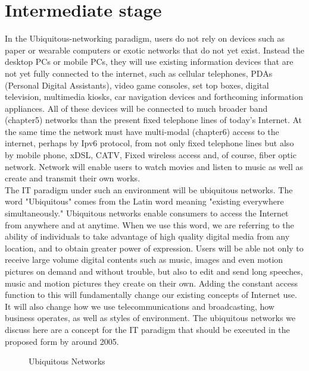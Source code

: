 \documentclass[12pt]{report}
\begin{document}
\section{Intermediate stage}
\hspace*{0.5in}In the Ubiquitous-networking paradigm, users do not rely on devices such as paper or wearable computers or exotic networks that do not yet exist. Instead the desktop PCs or mobile PCs, they will use existing information devices that are not yet fully connected to the internet, such as cellular telephones, PDAs (Personal Digital Assistants), video game consoles, set top boxes, digital television, multimedia kiosks, car navigation devices and forthcoming information appliances. All of these devices will be connected to much broader band (chapter5) networks than the present fixed telephone lines of today's Internet. At the same time the network must have multi-modal (chapter6) access to the internet, perhaps by Ipv6 protocol, from not only fixed telephone lines but also by mobile phone, xDSL, CATV, Fixed wireless access and, of course, fiber optic network. Network will enable users to watch movies and listen to music as well as create and transmit their own works.
\\\hspace*{0.5in}The IT paradigm under such an environment will be ubiquitous networks. The word "Ubiquitous" comes from the Latin word meaning "existing everywhere simultaneously." Ubiquitous networks enable consumers to access the Internet from anywhere and at anytime. When we use this word, we are referring to the ability of individuals to take advantage of high quality digital media from any location, and to obtain greater power of expression. Users will be able not only to receive large volume digital contents such as music, images and even motion pictures on demand and without trouble, but also to edit and send long speeches, music and motion pictures they create on their own. Adding the constant access function to this will fundamentally change our existing concepts of Internet use. It will also change how we use telecommunications and broadcasting, how business operates, as well as styles of environment. The ubiquitous networks we discuss here are a concept for the IT paradigm that should be executed in the proposed form by around 2005.
\begin{figure}[h]
\begin{center}
\centerline{}
\caption{Ubiquitous Networks}
\end{center}
\end{figure}
\end{document}
